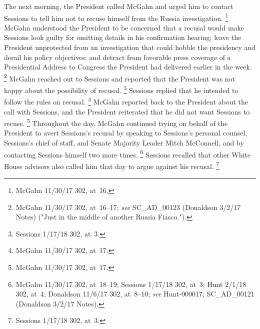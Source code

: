 The next morning, the President called McGahn and urged him to contact Sessions to tell him not to recuse himself from the Russia investigation.%
\footnote{McGahn 11/30/17 302, at~16.}
McGahn understood the President to be concerned that a recusal would make Sessions look guilty for omitting details in his confirmation hearing;
leave the President unprotected from an investigation that could hobble the presidency and derail his policy objectives;
and detract from favorable press coverage of a Presidential Address to Congress the President had delivered earlier in the week.%
\footnote{McGahn 11/30/17 302, at~16--17;
\textit{see} SC\_AD\_00123 (Donaldson 3/2/17 Notes) ("Just in the middle of another Russia Fiasco.").}
McGahn reached out to Sessions and reported that the President was not happy about the possibility of recusal.%
\footnote{Sessions 1/17/18 302, at~3.}
Sessions replied that he intended to follow the rules on recusal.%
\footnote{McGahn 11/30/17 302, at~17.}
McGahn reported back to the President about the call with Sessions, and the President reiterated that he did not want Sessions to recuse.%
\footnote{McGahn 11/30/17 302, at~17.}
Throughout the day, McGahn continued trying on behalf of the President to avert Sessions's recusal by speaking to Sessions's personal counsel, Sessions's chief of staff, and Senate Majority Leader Mitch McConnell, and by contacting Sessions himself two more times.%
\footnote{McGahn 11/30/17 302, at~18--19;
Sessions 1/17/18 302, at~3;
Hunt 2/1/18 302, at~4;
Donaldson 11/6/17 302, at~8--10;
\textit{see} Hunt-000017;
SC\_AD\_00121 (Donaldson 3/2/17 Notes).}
Sessions recalled that other White House advisors also called him that day to argue against his recusal.%
\footnote{Sessions 1/17/18 302, at~3.}

